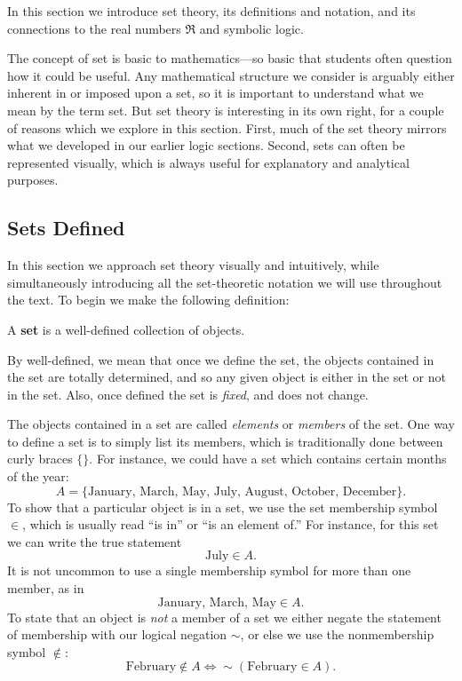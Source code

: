 In this section we introduce set theory, its definitions and
notation, and its connections to the real numbers $\Re$ 
and symbolic logic.

The concept of set is basic to mathematics---so 
basic that students often question how it could be useful.
Any mathematical structure we consider
is arguably either inherent in or imposed upon a set, so it
is important to understand what we mean by the term set.
But set theory is interesting in its own right, for
a couple of reasons which we explore in this section.
First, much of the set theory mirrors what we developed
in our earlier logic sections.  Second, sets can often
be represented visually, which is always useful for
explanatory and analytical purposes.


\subsection{Sets Defined}

In this section we approach set theory visually and intuitively,
while simultaneously introducing all the set-theoretic notation
we will use throughout the text.
To begin we make the following definition:

\begin{definition}A {\bf set} is a well-defined collection of
objects.\end{definition}

By well-defined, we mean that once we define the set, the objects
contained in the set are totally determined, and so any given
object is either in the set or not in the set.  Also, once defined
the set is {\it fixed}, and does not change.  

The objects contained in a set are called {\it elements} or {\it members}
of the set. One way to define a set is to simply list its members, which
is traditionally done
between curly braces $\{\}$. For instance, we could have a set
which contains certain months of the year:
$$A=\{\text{January, March, May, July, August, October, December}\}.$$
To show that a particular object is in a set, we use the
set membership symbol $\in$, which is usually read ``is in''
or ``is an element of.''  For instance, for this set we
can write the true statement
$$\text{July}\in A.$$
It is not uncommon to use a single membership symbol for more than
one member, as in 
$$\text{January, March, May}\in A.$$
To state that an object is {\it not} a 
member of a set we either negate the
statement of membership with our logical negation $\sim$, or
else we use the nonmembership symbol $\notin$:
$$\text{February}\notin A\iff\sim(\text{February}\in A).$$

